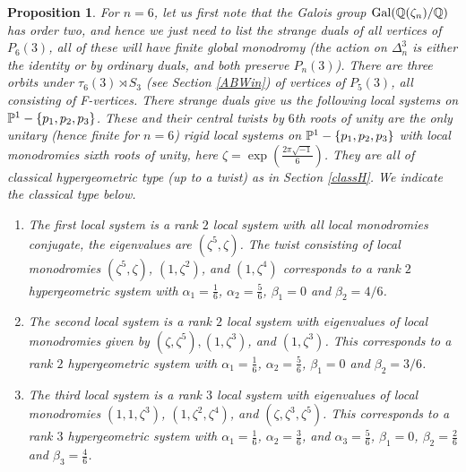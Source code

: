 \documentclass[11pt]{amsart}
\newcommand\op{\operatorname}
\newtheorem{proposition}[theorem]{Proposition}
\numberwithin{theorem}{subsection}
\begin{document}
{\begin{proposition}

For $n=6$, let us first note that the Galois group $\op{Gal}(\Bbb{Q}(\zeta_n)/\Bbb{Q})$ has order two, and hence we just need to list the strange duals of all vertices of $P_6(3)$, all of these will have finite global monodromy (the action on $\Delta_n^3$ is either the identity or by ordinary duals, and both preserve $P_n(3)$). There are three orbits under $\tau_6(3)\rtimes S_3$ (see Section \ref{ABWin})  of vertices of $P_5(3)$,  all consisting of F-vertices. There strange duals give us the following local systems
on $\Bbb{P}^{1}-\{p_1,p_2,p_3\}$. These and their central twists by $6$th roots of unity are the only unitary (hence finite for $n=6$) rigid local systems on $\Bbb{P}^{1}-\{p_1,p_2,p_3\}$ with local monodromies  sixth roots of unity, here $\zeta=\exp(\frac{2\pi\sqrt{-1}}{6})$. They are all of classical
hypergeometric type (up to a twist)  as in Section \ref{classH}. We indicate the classical type below.
\begin{enumerate}
\item The first local system is a rank $2$ local system with  all local monodromies conjugate, the eigenvalues are $(\zeta^5,\zeta)$. The twist consisting of local monodromies $(\zeta^5,\zeta)$, $(1,\zeta^2)$, and $ (1,\zeta^4)$ corresponds to a rank $2$ hypergeometric system with $\alpha_1=\frac{1}{6}$, $\alpha_2=\frac{5}{6}$, $\beta_1=0$ and  $\beta_2=4/6$.
\item The second local system is a rank $2$ local system with  eigenvalues of local monodromies  given by
$(\zeta,\zeta^5), (1,\zeta^3)$, and $(1,\zeta^3)$.  This corresponds to a rank $2$ hypergeometric system with $\alpha_1=\frac{1}{6}$, $\alpha_2=\frac{5}{6}$, $\beta_1=0$ and  $\beta_2=3/6$.
\item The third local system is a rank $3$ local system with eigenvalues of local monodromies $(1,1,\zeta^3)$, $(1,\zeta^2,\zeta^4)$, and $(\zeta,\zeta^3,\zeta^5)$. This  corresponds to a rank $3$ hypergeometric system with $\alpha_1=\frac{1}{6}$, $\alpha_2=\frac{3}{6}$,  and $\alpha_3= \frac{5}{6}$, $\beta_1=0$,  $\beta_2=\frac{2}{6}$ and $\beta_3=\frac{4}{6}$.
\end{enumerate}


\end{proposition}}
\end{document}
